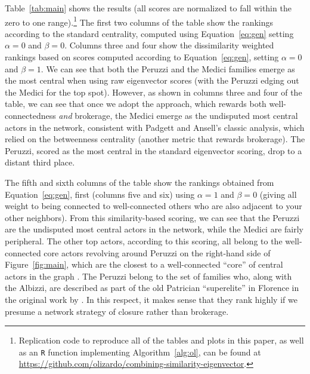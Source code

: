 \documentclass[12pt]{article}
\begin{document}
Table~\ref{tab:main} shows the results (all scores are normalized to fall within the zero to one range).\footnote{Replication code to reproduce all of the tables and plots in this paper, as well as an \texttt{R} function implementing Algorithm~\ref{alg:ol}, can be found at \url{https://github.com/olizardo/combining-similarity-eigenvector}.} The first two columns of the table show the rankings according to the standard \citet{bonacich1972factoring-03e} centrality, computed using Equation~\ref{eq:gen} setting $\alpha = 0$ and $\beta = 0$. Columns three and four show the \citet{alvarez-socorro2015eigencentrality-66c} dissimilarity weighted rankings based on scores computed according to Equation~\ref{eq:gen}, setting $\alpha = 0$ and $\beta = 1$. We can see that both the Peruzzi and the Medici families emerge as the most central when using raw eigenvector scores (with the Peruzzi edging out the Medici for the top spot). However, as shown in columns three and four of the table, we can see that once we adopt the \citet{alvarez-socorro2015eigencentrality-66c} approach, which rewards both well-connectedness \textit{and} brokerage, the Medici emerge as the undisputed most central actors in the network, consistent with Padgett and Ansell's \citeyearpar{padgett1993robust-4cc} classic analysis, which relied on the betweenness centrality (another metric that rewards brokerage). The Peruzzi, scored as the most central in the standard eigenvector scoring, drop to a distant third place. 

The fifth and sixth columns of the table show the rankings obtained from Equation~\ref{eq:gen}, first (columns five and six) using $\alpha = 1$ and $\beta = 0$ (giving all weight to being connected to well-connected others who are also adjacent to your other neighbors). From this similarity-based scoring, we can see that the Peruzzi are the undisputed most central actors in the network, while the Medici are fairly peripheral. The other top actors, according to this scoring, all belong to the well-connected core actors revolving around Peruzzi on the right-hand side of Figure~\ref{fig:main}, which are the closest to a well-connected ``core'' of central actors in the graph \citep{borgatti2000models-3c1}. The Peruzzi belong to the set of families who, along with the Albizzi, are described as part of the old Patrician ``superelite'' in Florence in the original work by \citet[1284]{padgett1993robust-4cc}. In this respect, it makes sense that they rank highly if we presume a network strategy of closure rather than brokerage. 
\end{document}
